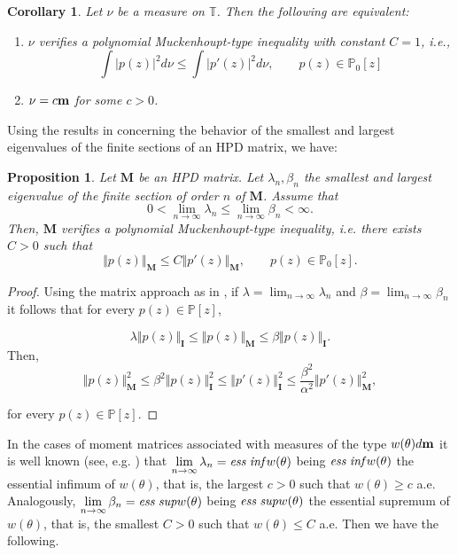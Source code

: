 \documentclass[12pt]{amsart}
\theoremstyle{definition}
\theoremstyle{plain}
\newtheorem{corollary}{Corollary}
\newtheorem{prop}{Proposition}
\theoremstyle{remark}
\begin{document}
\begin{corollary} Let $\nu$ be a measure on $\mathbb{T}$. Then the following are equivalent: 
\begin{enumerate} 
\item $\nu$ verifies a polynomial Muckenhoupt-type inequality with constant $C=1$, i.e., 
$$
\int \vert p(z) \vert^{2} d\nu \leq \int \vert p'(z) \vert^{2} d\nu , \qquad p(z) \in \mathbb{P}_0[z]
$$
\item $\nu=c{\bf m}$ for some $c>0$. 

\end{enumerate}  
\end{corollary}  
\noindent Using the results in \cite{EGT1} concerning the behavior of the smallest and largest eigenvalues of the finite sections of an HPD matrix, we have:  

\begin{prop} Let $\mathbf{M}$ be an HPD matrix. Let $\lambda_n,\beta_n$ the smallest and largest eigenvalue of the finite section of order $n$ of $\mathbf{M}$. Assume that 
$$
0 < \lim_{n\to \infty} \lambda_n \leq \lim_{n\to \infty} \beta_n < \infty.$$
\noindent Then, $\mathbf{M}$ verifies a polynomial Muckenhoupt-type inequality, i.e. there exists $C>0$ such that 
$$
\Vert p(z) \Vert_{\mathbf{M}} \leq C\Vert p'(z) \Vert_{\mathbf{M}}, \qquad p(z) \in \mathbb{P}_0[z].
$$
\end{prop}
\begin{proof} Using the matrix approach as in  \cite{EGT1}, if $\lambda=\displaystyle{\lim_{n \to \infty}} \lambda_n$ and $\beta= \displaystyle{\lim_{n\to \infty} \beta_n}$ it follows that for every $p(z) \in \mathbb{P}[z]$,

$$
\lambda \Vert p(z) \Vert_{ \mathbf{I}}  \leq \Vert p(z) \Vert_{\mathbf{M}} \leq \beta \Vert p(z) \Vert_{\mathbf{I}}. 
$$
\noindent Then, 
$$
\Vert p(z) \Vert^{2}_{\mathbf{M}} \leq \beta^2 \Vert p(z) \Vert^{2}_{\mathbf{I}} \leq \Vert p'(z) \Vert^{2}_{\mathbf{I}} \leq \dfrac{\beta^2}{\alpha^{2}} \Vert p'(z) \Vert^{2}_{\mathbf{M}},
$$

\noindent for every $p(z)\in \mathbb{P}[z]$.
\end{proof}



\noindent In the cases of moment matrices associated with measures of the type $w(\theta)d{\bf m}$ it is well known (see, e.g. \cite{Grenader}) that $\displaystyle{\lim_{n\to \infty}\lambda_n}= {\it ess}\;  {\it inf} w(\theta)$ being ${\it ess}\;  {\it inf} w(\theta) $ the essential infimum of $w(\theta)$, that is, the largest $c>0$ such that $w(\theta) \geq c$ a.e. Analogously,  $\displaystyle{\lim_{n\to \infty}\beta_n}= {\it ess}\;  {\it sup} w(\theta)$ being ${\it ess}\;  {\it sup} w(\theta) $ the essential supremum of $w(\theta)$, that is, the smallest $C>0$ such that $w(\theta) \leq C$ a.e. Then we have the following. 
\end{document}

